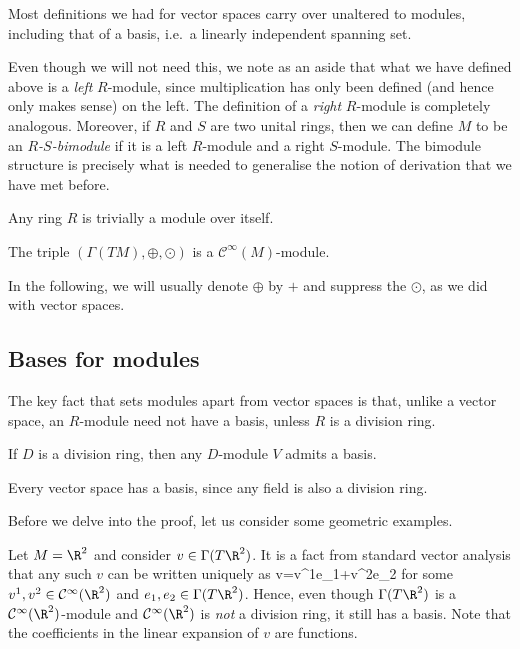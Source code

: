 Most definitions we had for vector spaces carry over unaltered to modules, including that of a basis, i.e.\ a linearly independent spanning set.

\br
Even though we will not need this, we note as an aside that what we have defined above is a \emph{left} $R$-module, since multiplication has only been defined (and hence only makes sense) on the left. The definition of a \emph{right} $R$-module is completely analogous. Moreover, if $R$ and $S$ are two unital rings, then we can define $M$ to be an \emph{$R$-$S$-bimodule} if it is a left $R$-module and a right $S$-module. The bimodule structure is precisely what is needed to generalise the notion of derivation that we have met before.
\er

\be
Any ring $R$ is trivially a module over itself.
\ee

\be
The triple $(\Gamma(TM),\oplus,\odot)$ is a $\mathcal{C}^\infty(M)$-module.
\ee

In the following, we will usually denote $\oplus$ by $+$ and suppress the $\odot$, as we did with vector spaces.

\subsection{Bases for modules}

The key fact that sets modules apart from vector spaces is that, unlike a vector space, an $R$-module need not have a basis, unless $R$ is a division ring. 

\begin{theorem}
\label{thm:everybasis}
If $D$ is a division ring, then any $D$-module $V$ admits a basis.
\end{theorem}

\bc
Every vector space has a basis, since any field is also a division ring.
\ec

Before we delve into the proof, let us consider some geometric examples.

\be
\ben[label=\alph*)]
\item Let $M = \R^2$ and consider $v\in \Gamma(T\R^2)$. It is a fact from standard vector analysis that any such $v$ can be written uniquely as
\bse
v=v^1e_1+v^2e_2
\ese
for some $v^1,v^2\in \mathcal{C}^\infty(\R^2)$ and $e_1,e_2\in \Gamma(T\R^2)$. Hence, even though $\Gamma(T\R^2)$ is a $\mathcal{C}^\infty(\R^2)$-module and $\mathcal{C}^\infty(\R^2)$ is \emph{not} a division ring, it still has a basis. Note that the coefficients in the linear expansion of $v$ are functions.

